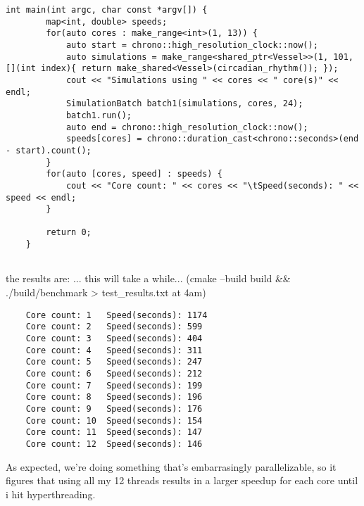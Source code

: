 \begin{lstlisting}[style=colorC++]
    int main(int argc, char const *argv[]) {
        map<int, double> speeds;
        for(auto cores : make_range<int>(1, 13)) {
            auto start = chrono::high_resolution_clock::now();
            auto simulations = make_range<shared_ptr<Vessel>>(1, 101, [](int index){ return make_shared<Vessel>(circadian_rhythm()); });
            cout << "Simulations using " << cores << " core(s)" << endl;
            SimulationBatch batch1(simulations, cores, 24);
            batch1.run();
            auto end = chrono::high_resolution_clock::now();
            speeds[cores] = chrono::duration_cast<chrono::seconds>(end - start).count();
        }
        for(auto [cores, speed] : speeds) {
            cout << "Core count: " << cores << "\tSpeed(seconds): " << speed << endl;
        }
    
        return 0;
    }
    
\end{lstlisting}

the results are: ... this will take a while... (cmake --build build \&\& ./build/benchmark > test\_results.txt at 4am)

\begin{lstlisting}
    Core count: 1   Speed(seconds): 1174
    Core count: 2   Speed(seconds): 599
    Core count: 3   Speed(seconds): 404
    Core count: 4   Speed(seconds): 311
    Core count: 5   Speed(seconds): 247
    Core count: 6   Speed(seconds): 212
    Core count: 7   Speed(seconds): 199
    Core count: 8   Speed(seconds): 196
    Core count: 9   Speed(seconds): 176
    Core count: 10  Speed(seconds): 154
    Core count: 11  Speed(seconds): 147
    Core count: 12  Speed(seconds): 146
\end{lstlisting}

As expected, we're doing something that's embarrasingly parallelizable, so it figures that using all my 12 threads results in a larger speedup for each core until i hit hyperthreading.